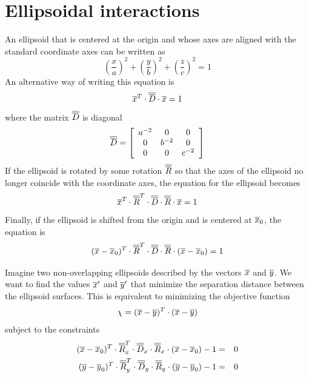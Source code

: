 \documentclass[12pt]{article}
\begin{document}
\section{Ellipsoidal interactions}
An ellipsoid that is centered at the origin and whose axes are aligned with the standard coordinate axes
can be written as
\[
\left(\frac{x}{a}\right)^2+\left(\frac{y}{b}\right)^2+\left(\frac{z}{c}\right)^2=1
\]
An alternative way of writing this equation is
\[
\overline{x}^T\cdot\overline{\overline{D}}\cdot\overline{x}=1
\]
where the matrix $\overline{\overline{D}}$ is diagonal
\[
\overline{\overline{D}} = \left[\begin{array}{ccc}
a^{-2} & 0 & 0 \\
0 & b^{-2} & 0 \\
0 & 0 & c^{-2}
\end{array}\right]
\]
If the ellipsoid is rotated by some rotation $\overline{\overline{R}}$ so that the axes of the ellipsoid no longer coincide
with the coordinate axes, the equation for the ellipsoid becomes
\[
\overline{x}^T\cdot\overline{\overline{R}}^{T}\cdot\overline{\overline{D}}\cdot\overline{\overline{R}}\cdot\overline{x} = 1
\]
Finally, if the ellipsoid is shifted from the origin and is centered at $\overline{x}_{0}$, the equation is
\[
(\overline{x}-\overline{x}_0)^T\cdot\overline{\overline{R}}^{T}\cdot\overline{\overline{D}}\cdot\overline{\overline{R}}\cdot(\overline{x}-\overline{x}_0) = 1
\]

Imagine two non-overlapping ellipsoids described by the vectors $\overline{x}$ and $\overline{y}$. We want to find the
values $\overline{x}'$ and $\overline{y}'$ that minimize the separation distance between the ellipsoid surfaces. This
is equivalent to minimizing the objective function
\[
\chi = (\overline{x}-\overline{y})^T\cdot(\overline{x}-\overline{y})
\]
subject to the constraints
\begin{eqnarray*}
(\overline{x}-\overline{x}_0)^T\cdot\overline{\overline{R}}_x^{T}\cdot\overline{\overline{D}}_x\cdot\overline{\overline{R}}_x\cdot(\overline{x}-\overline{x}_0)-1 & = & 0 \\
(\overline{y}-\overline{y}_0)^T\cdot\overline{\overline{R}}_y^{T}\cdot\overline{\overline{D}}_y\cdot\overline{\overline{R}}_y\cdot(\overline{y}-\overline{y}_0)-1 & = & 0
\end{eqnarray*}
\end{document}
